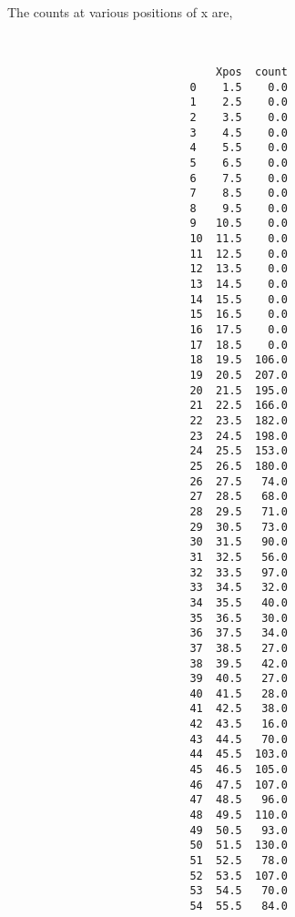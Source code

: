 \documentclass{article}
\begin{document}
The counts at various positions of x are,
\begin{verbatim}


                                Xpos  count
                            0    1.5    0.0
                            1    2.5    0.0
                            2    3.5    0.0
                            3    4.5    0.0
                            4    5.5    0.0
                            5    6.5    0.0
                            6    7.5    0.0
                            7    8.5    0.0
                            8    9.5    0.0
                            9   10.5    0.0
                            10  11.5    0.0
                            11  12.5    0.0
                            12  13.5    0.0
                            13  14.5    0.0
                            14  15.5    0.0
                            15  16.5    0.0
                            16  17.5    0.0
                            17  18.5    0.0
                            18  19.5  106.0
                            19  20.5  207.0
                            20  21.5  195.0
                            21  22.5  166.0
                            22  23.5  182.0
                            23  24.5  198.0
                            24  25.5  153.0
                            25  26.5  180.0
                            26  27.5   74.0
                            27  28.5   68.0
                            28  29.5   71.0
                            29  30.5   73.0
                            30  31.5   90.0
                            31  32.5   56.0
                            32  33.5   97.0
                            33  34.5   32.0
                            34  35.5   40.0
                            35  36.5   30.0
                            36  37.5   34.0
                            37  38.5   27.0
                            38  39.5   42.0
                            39  40.5   27.0
                            40  41.5   28.0
                            41  42.5   38.0
                            42  43.5   16.0
                            43  44.5   70.0
                            44  45.5  103.0
                            45  46.5  105.0
                            46  47.5  107.0
                            47  48.5   96.0
                            48  49.5  110.0
                            49  50.5   93.0
                            50  51.5  130.0
                            51  52.5   78.0
                            52  53.5  107.0
                            53  54.5   70.0
                            54  55.5   84.0

\end{verbatim}
\end{document}

